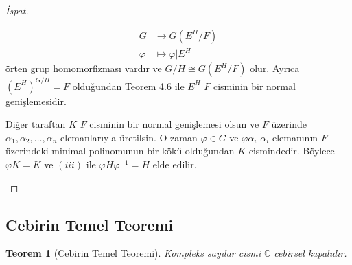 \documentclass[draft]{article}
\newtheorem{thm}{Teorem}[section]
\theoremstyle{definition}
\theoremstyle{remark}
\begin{document}
\begin{proof}[İspat]
\begin{enumerate}
    			    \begin{align*}
    			        G &\to G(E^H/F)\\
    			        \varphi &\mapsto \varphi|E^H
    			    \end{align*}
    			    örten grup homomorfizması vardır ve $G/H \cong G(E^H/F)$ olur. Ayrıca $(E^H)^{G/H} = F$ olduğundan Teorem 4.6 ile $E^H$ $F$ cisminin bir normal genişlemesidir.\par
    			    Diğer taraftan $K$ $F$ cisminin bir normal genişlemesi olsun ve $F$ üzerinde $\alpha_1, \alpha_2, \dots, \alpha_n$ elemanlarıyla üretilsin. O zaman $\varphi \in G$ ve $\varphi \alpha_i$ $\alpha_i$ elemanının $F$ üzerindeki minimal polinomunun bir kökü olduğundan $K$ cismindedir. Böylece $\varphi K = K$ ve $(iii)$ ile $\varphi H \varphi^{-1} = H$ elde edilir.
    			\end{enumerate}
    	    \end{proof}
    	    
    	\subsection{Cebirin Temel Teoremi}
    	
    	    \begin{thm}[Cebirin Temel Teoremi]
    	        Kompleks sayılar cismi $\mathbb{C}$ cebirsel kapalıdır.
    	    \end{thm}
    	    
\end{document}
